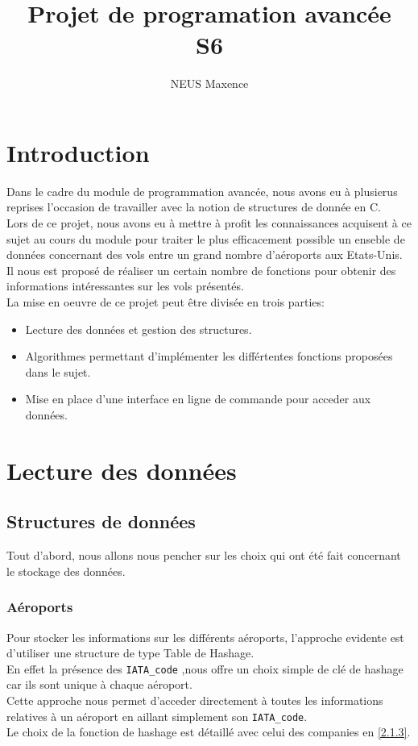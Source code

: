 \documentclass[a4paper, 9pt]{article}
\begin{document}
	\title{Projet de programation avancée\\S6}
	\author{NEUS Maxence}
	\date{}
	\maketitle
	
	\tableofcontents
	\newpage
	
	\section{Introduction}
	Dans le cadre du module de programmation avancée, nous avons eu à plusierus reprises l'occasion de travailler avec la notion de structures de donnée en C.\\
	Lors de ce projet, nous avons eu à mettre à profit les connaissances acquisent à ce sujet au cours du module pour traiter le plus efficacement possible un enseble de données concernant des vols entre un grand nombre d'aéroports aux Etats-Unis. Il nous est proposé de réaliser un certain nombre de fonctions pour obtenir des informations intéressantes sur les vols présentés.\\
	La mise en oeuvre de ce projet peut être divisée en trois parties: 
	\begin{itemize}
		\item Lecture des données et gestion des structures.
		\item Algorithmes permettant d'implémenter les différtentes fonctions proposées dans le sujet.
		\item Mise en place d'une interface en ligne de commande pour acceder aux données.
	\end{itemize}

	\section{Lecture des données}
	\subsection{Structures de données}
	Tout d'abord, nous allons nous pencher sur les choix qui ont été fait concernant le stockage des données.
	\subsubsection{Aéroports}
	Pour stocker les informations sur les différents aéroports, l'approche evidente est d'utiliser une structure de type Table de Hashage.\\
	En effet la présence des \lstinline|IATA_code| ,nous offre un choix simple de clé de hashage car ils sont unique à chaque aéroport.\\
	Cette approche nous permet d'acceder directement à toutes les informations relatives à un aéroport en aillant simplement son \lstinline|IATA_code|.\\
	Le choix de la fonction de hashage est détaillé avec celui des companies en \ref{2.1.3}.\\
	
\end{document}
